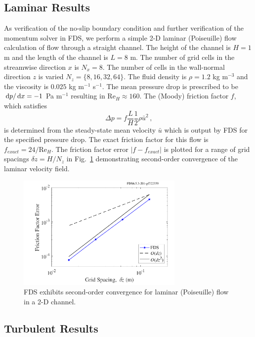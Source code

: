 \documentclass[11pt]{book}
\begin{document}
\subsection{Laminar Results}
\label{laminar}

As verification of the no-slip boundary condition and further verification of the momentum solver in FDS, we perform a simple 2-D laminar (Poiseuille) flow calculation of
flow through a straight channel.
The height of the channel is $H=1$ m and the length of the channel is $L=8$ m.
The number of grid cells in the streamwise direction $x$ is $N_x = 8$.  The number of cells in the wall-normal direction $z$ is varied $N_z = \{8,16,32,64\}$.
The fluid density is $\rho = 1.2$ kg m$^{-3}$ and the viscosity is $0.025$ kg m$^{-1}$ s$^{-1}$.
The mean pressure drop is prescribed to be $\,\mathrm{d} p/ \,\mathrm{d} x = -1$ Pa m$^{-1}$ resulting in Re$_H \approx 160$.  The (Moody) friction factor $f$, which satisfies
\begin{equation}
\label{eqn_moodyf}
\Delta p = f \frac{L}{H} \frac{1}{2} \rho \bar{u}^2 \,\mbox{,}
\end{equation}
is determined from the steady-state mean velocity $\bar{u}$ which is output by FDS for the specified pressure drop.  The exact friction factor for this flow is $f_{exact} = 24/\mbox{Re}_H$.  The friction factor error $|f-f_{exact}|$ is plotted for a range of grid spacings $\delta z = H/N_z$ in Fig.~\ref{fig_poiseuille_convergence} demonstrating second-order convergence of the laminar velocity field.
\begin{figure}
\centering
\includegraphics[height=2.2in]{SCRIPT_FIGURES/poiseuille_convergence}
\caption[Convergence for laminar (Poiseuille) flow in a 2-D channel]{FDS exhibits second-order convergence for laminar (Poiseuille) flow in a 2-D channel.}
\label{fig_poiseuille_convergence}
\end{figure}

\subsection{Turbulent Results}
\label{turbulent}
\end{document}
